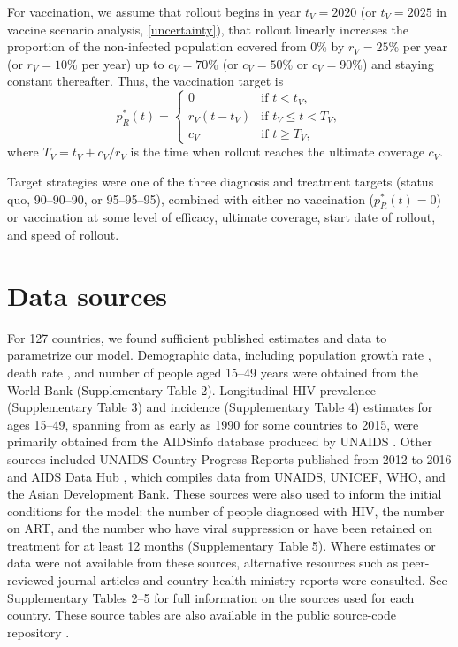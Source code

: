 \documentclass{article}
\begin{document}
For vaccination, we assume that rollout begins in year $t_V = 2020$
(or $t_V = 2025$ in vaccine scenario analysis, \autoref{uncertainty}),
that rollout linearly increases the proportion of the non-infected
population covered from 0\% by $r_V = 25\%$ per year (or $r_V = 10\%$
per year) up to $c_V = 70\%$ (or $c_V = 50\%$ or $c_V = 90\%$) and
staying constant thereafter.  Thus, the vaccination target is
\begin{equation}
  \label{vaccination_target}
  p_R^*(t) =
  \begin{cases}
    0 & \text{if $t < t_V$},
    \\
    r_V (t - t_V) & \text{if $t_V \leq t < T_V$},
    \\
    c_V & \text{if $t \geq T_V$},
  \end{cases}
\end{equation}
where $T_V = t_V + c_V / r_V$ is the time when rollout reaches
the ultimate coverage $c_V$.

Target strategies were one of the three diagnosis and treatment
targets (status quo, 90--90--90, or 95--95--95), combined with either
no vaccination ($p_R^*(t) = 0$) or vaccination at some level of
efficacy, ultimate coverage, start date of rollout, and speed of
rollout.


\section{Data sources}
\label{data_sources}

For 127 countries, we found sufficient published estimates and data to
parametrize our model.  Demographic data, including population growth
rate \autocite{WorldBankpg}, death rate
\autocite{World_Development_Indicators2013-ee}, and number of people
aged 15--49 years \autocite{The_World_Bank2016-fd} were obtained from
the World Bank (Supplementary Table 2). Longitudinal HIV prevalence
(Supplementary Table 3) and incidence (Supplementary Table 4)
estimates for ages 15--49, spanning from as early as 1990 for some
countries to 2015, were primarily obtained from the AIDSinfo database
produced by UNAIDS \autocite{Unaids2016-an}. Other sources included
UNAIDS Country Progress Reports \autocite{Unaids2016-am} published
from 2012 to 2016 and AIDS Data Hub \autocite{AIDSdatahub-fg}, which
compiles data from UNAIDS, UNICEF, WHO, and the Asian Development
Bank. These sources were also used to inform the initial conditions
for the model: the number of people diagnosed with HIV, the number on
ART, and the number who have viral suppression or have been retained
on treatment for at least 12 months (Supplementary Table 5). Where
estimates or data were not available from these sources, alternative
resources such as peer-reviewed journal articles and country health
ministry reports were consulted.  See Supplementary Tables 2--5 for
full information on the sources used for each country.  These source
tables are also available in the public source-code repository
\autocite{medlock2016-git}.
\end{document}
